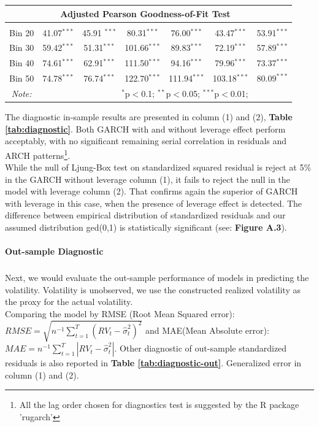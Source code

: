\documentclass[a4paper]{article}
\begin{document}
\begin{table}[!htbp]
\begin{tabular}{@{\extracolsep{5pt}}ccccccc}
& \multicolumn{5}{c}{\textbf{Adjusted Pearson Goodness-of-Fit Test}}\\
\hline \\[-1.8ex] 
Bin 20 & 41.07$^{***}$ & 45.91 $^{***}$ & 80.31$^{***}$ & 76.00$^{***}$ & 43.47$^{***}$ & 53.91$^{***}$ \\ 
Bin 30 & 59.42$^{***}$ & 51.31$^{***}$ & 101.66$^{***}$ & 89.83$^{***}$ & 72.19$^{***}$ & 57.89$^{***}$\\ 
Bin 40 & 74.61$^{***}$ & 62.91$^{***}$ & 111.50$^{***}$ & 94.16$^{***}$ & 79.96$^{***}$ & 73.37$^{***}$\\
Bin 50 & 74.78$^{***}$ & 76.74$^{***}$ & 122.70$^{***}$ & 111.94$^{***}$ & 103.18$^{***}$ & $80.09^{***}$\\
\hline 
\textit{Note:}  & \multicolumn{5}{r}{$^{*}$p$<$0.1; $^{**}$p$<$0.05; $^{***}$p$<$0.01;} \\ 
\end{tabular} 
\end{table} 


The diagnostic in-sample results are presented in column (1) and (2), \textbf{Table \ref{tab:diagnostic}}. Both GARCH with and without leverage effect perform acceptably, with no significant remaining serial correlation in residuals and ARCH patterns\footnote{All the lag order chosen for diagnostics test is suggested by the R package 'rugarch'}. \\

While the null of Ljung-Box test on standardized squared residual is reject at 5\% in the GARCH without leverage column (1), it fails to reject the null in the model with leverage column (2). That confirms again the superior of GARCH with leverage in this case, when the presence of leverage effect is detected. 
The difference between empirical distribution of standardized residuals and our assumed distribution ged(0,1) is statistically significant (see: \textbf{Figure A.3}). 

\paragraph*{Out-sample Diagnostic}
\subparagraph*{}
Next, we would evaluate the out-sample performance of models in predicting the volatility. Volatility is unobserved, we use the constructed realized volatility as the proxy for the actual volatility. \\ 

Comparing the model by RMSE (Root Mean Squared error): $RMSE = \sqrt{n^{-1} \sum_{t=1}^{T}(RV_{t} - \hat{\sigma}^2_{t})^2}$ and MAE(Mean Absolute error): $MAE = n^{-1} \sum_{t=1}^{T}|RV_{t} - \hat{\sigma}^2_{t}|$. Other diagnostic of out-sample standardized residuals is also reported in \textbf{Table \ref{tab:diagnostic-out}}. Generalized error in column (1) and (2).\\
\end{document}
